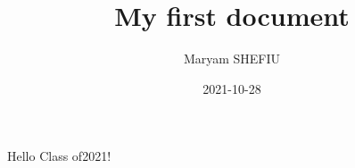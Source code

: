 \documentclass{article}
\title{My first document}
\date{2021-10-28}
\author{Maryam SHEFIU}
\begin{document}
	\maketitle
	\newpage
	Hello Class of2021!
\end{document}
